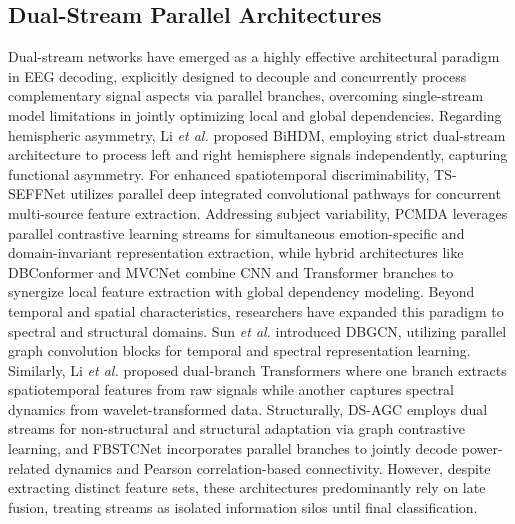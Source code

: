 \documentclass[journal]{IEEEtran}
\theoremstyle{plain}
\begin{document}
\subsection{Dual-Stream Parallel Architectures}
Dual-stream networks have emerged as a highly effective architectural paradigm in EEG decoding, explicitly designed to decouple and concurrently process complementary signal aspects via parallel branches, overcoming single-stream model limitations in jointly optimizing local and global dependencies.  Regarding hemispheric asymmetry, Li \textit{et al.} \cite{li2021novel} proposed BiHDM, employing strict dual-stream architecture to process left and right hemisphere signals independently, capturing functional asymmetry. For enhanced spatiotemporal discriminability, TS-SEFFNet \cite{li2022ts} utilizes parallel deep integrated convolutional pathways for concurrent multi-source feature extraction. Addressing subject variability, PCMDA \cite{li2025neuron} leverages parallel contrastive learning streams for simultaneous emotion-specific and domain-invariant representation extraction, while hybrid architectures like DBConformer \cite{wang2025dbconformer} and MVCNet \cite{wang2025mvcnet} combine CNN and Transformer branches to synergize local feature extraction with global dependency modeling. Beyond temporal and spatial characteristics, researchers have expanded this paradigm to spectral and structural domains. Sun \textit{et al.} \cite{sun2022dbgcn} introduced DBGCN, utilizing parallel graph convolution blocks for temporal and spectral representation learning. Similarly, Li \textit{et al.} \cite{Li2025Dual-TSST} proposed dual-branch Transformers where one branch extracts spatiotemporal features from raw signals while another captures spectral dynamics from wavelet-transformed data. Structurally, DS-AGC \cite{Ye2025DS-AGC} employs dual streams for non-structural and structural adaptation via graph contrastive learning, and FBSTCNet \cite{Huang2024FBSTCNet} incorporates parallel branches to jointly decode power-related dynamics and Pearson correlation-based connectivity. However, despite extracting distinct feature sets, these architectures predominantly rely on late fusion, treating streams as isolated information silos until final classification.
\end{document}
